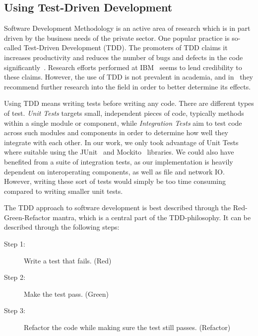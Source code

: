 \documentclass[UKenglish, a4paper]{ifimaster}
\begin{document}
        \subsection{Using Test-Driven Development}

        Software Development Methodology is an active area of research
        which is in part driven by the business needs of the private
        sector\cite{janzen2005test}. One popular practice is so-called Test-Driven
        Development (TDD). The promoters of TDD claims it increases
        productivity and reduces the number of bugs and defects in the
        code significantly~\cite{beck2003test}. Research
        efforts performed at IBM~\cite{maximilien2003assessing} seems to
        lend credibility to these claims. However, the use of TDD is not
        prevalent in academia, and in~\cite{janzen2005test} they
        recommend further research into the field in order to better
        determine its effects.

        Using TDD means writing tests before writing any code. There are
        different types of test. \emph{Unit Tests} targets small,
        independent pieces of code, typically methods within a single
        module or component, while \emph{Integration Tests} aim to test
        code across such modules and components in order to determine
        how well they integrate with each other. In our work, we only
        took advantage of Unit Tests where suitable using the
        JUnit~\cite{junit} and Mockito~\cite{mockito} libraries.
        We could also have benefited from a suite of integration tests,
        as our implementation is heavily dependent on interoperating
        components, as well as file and network IO\@. However, writing
        these sort of tests would simply be too time consuming compared
        to writing smaller unit tests.

        The TDD approach to software development is best described through the
        Red-Green-Refactor mantra, which is a central part of the
        TDD-philosophy. It can be described through the following steps:

        \begin{description}
            \item[Step 1: ] Write a test that fails. (Red)
            \item[Step 2:] Make the test pass. (Green)
            \item[Step 3:] Refactor the code while making sure the test
                still passes. (Refactor)
        \end{description}
\end{document}
